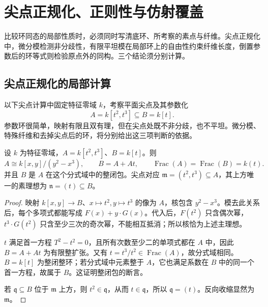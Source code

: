 
\section{尖点正规化、正则性与仿射覆盖}
\label{b3:sec:2304}

比较环同态的局部性质时，必须同时写清底环、所考察的素点与纤维。尖点正规化中，微分模检测非分歧性，有限平坦模在局部环上的自由性约束纤维长度，倒置参数后的环等式则检验原点外的同构。三个结论须分别计算。

%
%
%

\subsection{尖点正规化的局部计算}
\label{b3:subsec:2304:01}
\label{b3:subsec:cusp-normalization-setup}

以下尖点计算中固定特征零域 \(k\)，考察平面尖点及其参数化
\[
	A=k[t^2,t^3]\subseteq B=k[t].
\]
参数环很简单，映射有限且双有理，但在尖点处既不非分歧，也不平坦。微分模、特殊纤维和去掉尖点后的环，将分别给出这三项判断的依据。

\begin{proposition}\label{b3:prop:cusp-normalization-setup}
	设 \(k\) 为特征零域，\(A=k[t^2,t^3]\)、\(B=k[t]\)。则
	\[
		A\cong k[x,y]/(y^2-x^3),\qquad B=A+At, \qquad\operatorname{Frac}(A)=\operatorname{Frac}(B)=k(t).
	\]
	并且 \(B\) 是 \(A\) 在这个分式域中的整闭包。尖点对应 \(\mathfrak m=(t^2,t^3)\subseteq A\)，其上方唯一的素理想为 \(\mathfrak n=(t)\subseteq B\)。
\end{proposition}
\begin{proof}
	映射 \(k[x,y]\to B\)、\(x\mapsto t^2,y\mapsto t^3\) 的像为 \(A\)，核包含 \(y^2-x^3\)。模去此关系后，每个多项式都能写成 \(F(x)+y\cdot G(x)\)。代入后，\(F(t^2)\) 只含偶次幂，\(t^3\cdot G(t^2)\) 只含至少三次的奇次幂，不能相互抵消；所以核恰为上述主理想。

	\(t\) 满足首一方程 \(T^2-t^2=0\)，且所有次数至少二的单项式都在 \(A\) 中，因此 \(B=A+At\) 为有限整扩张。又有 \(t=t^3/t^2\in\operatorname{Frac}(A)\)，故分式域相同。\(B=k[t]\) 为整闭整环；若分式域中元素整于 \(A\)，它也满足系数在 \(B\) 中的同一个首一方程，故属于 \(B\)。这证明整闭包的断言。

	若 \(\mathfrak q\subseteq B\) 位于 \(\mathfrak m\) 上方，则 \(t^2\in\mathfrak q\)，从而 \(t\in\mathfrak q\)，所以 \(\mathfrak q=(t)\)。反向收缩显然为 \(\mathfrak m\)。
\end{proof}

